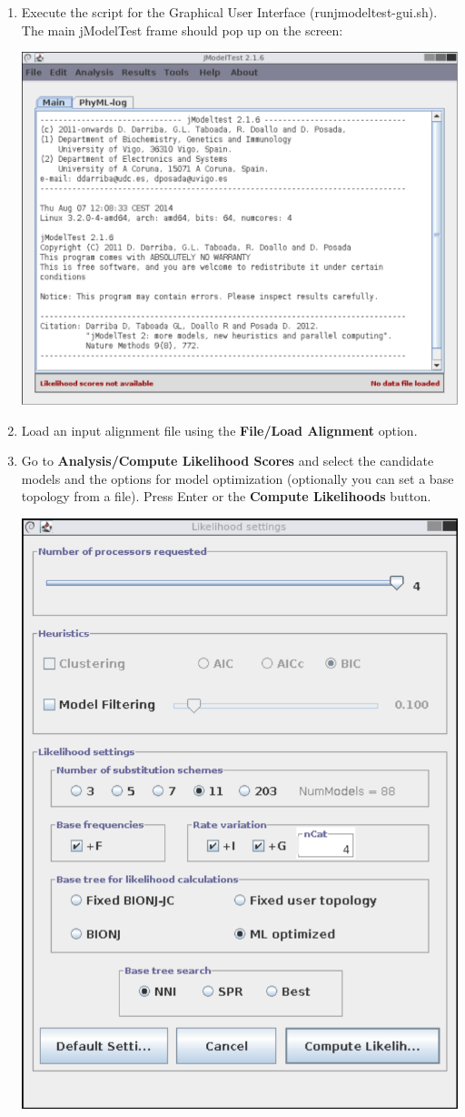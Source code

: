 \begin{enumerate}
\item Execute the script for the Graphical User Interface (runjmodeltest-gui.sh). The main jModelTest frame should pop up on the screen:

\begin{center}
\includegraphics[width=.9\textwidth]{images/main-window}
\end{center}

\item Load an input alignment file using the {\bf File/Load Alignment} option.

\item Go to {\bf Analysis/Compute Likelihood Scores} and select the candidate models and the options for model optimization (optionally you can set a base topology from a file). Press Enter or the {\bf Compute Likelihoods} button.

\begin{center}
\includegraphics[width=.6\textwidth]{images/lkl-settings}
\end{center}


\end{enumerate}
